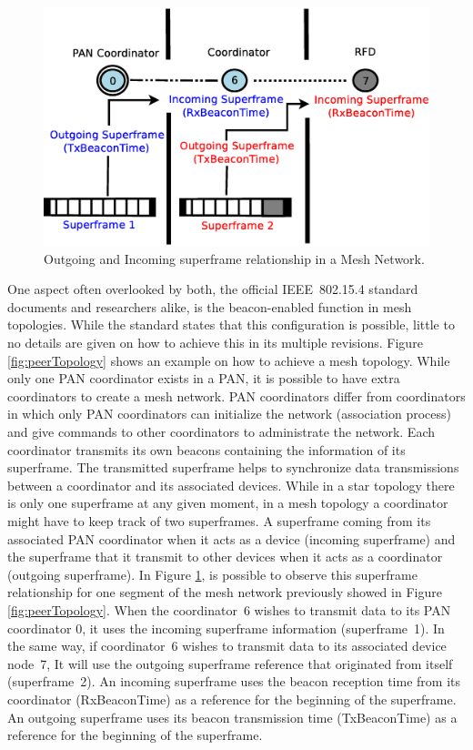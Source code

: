 \documentclass[conference]{IEEEtran}
\begin{document}
\begin{figure}[!htb]
\centering
\includegraphics[scale=.28]{superframeRef}
\caption{Outgoing and Incoming superframe relationship in a Mesh Network.}
\label{fig:superframeRef}
\end{figure}

One aspect often overlooked by both, the official \mbox{IEEE 802.15.4} standard documents and researchers alike, is the beacon-enabled function in mesh topologies. While the standard states that this configuration is possible, little to no details are given on how to achieve this in its multiple revisions. Figure \ref{fig:peerTopology} shows an example on how to achieve a mesh topology. While only one PAN coordinator exists in a PAN, it is possible to have extra coordinators to create a mesh network. PAN coordinators differ from coordinators in which only PAN coordinators can initialize the network (association process) and give commands to other coordinators to administrate the network. Each coordinator transmits its own beacons containing the information of its superframe. The transmitted superframe helps to synchronize data transmissions between a coordinator and its associated devices. While in a star topology there is only one superframe at any given moment, in a mesh topology a coordinator might have to keep track of two superframes. A superframe coming from its associated PAN coordinator when it acts as a device (incoming superframe) and the superframe that it transmit to other devices when it acts as a coordinator (outgoing superframe).  In Figure \ref{fig:superframeRef}, is possible to observe this superframe relationship for one segment of the mesh network previously showed in Figure \ref{fig:peerTopology}. When the \mbox{coordinator 6} wishes to transmit data to its PAN coordinator 0, it uses the incoming superframe information \mbox{(superframe 1)}. In the same way, if \mbox{coordinator 6} wishes to transmit data to its associated device \mbox{node 7}, It will use the outgoing superframe reference that originated from itself \mbox{(superframe 2)}. An incoming superframe uses the beacon reception time from its coordinator (RxBeaconTime) as a reference for the beginning of the superframe. An outgoing superframe uses its beacon transmission time (TxBeaconTime) as a reference for the beginning of the superframe.
\end{document}
